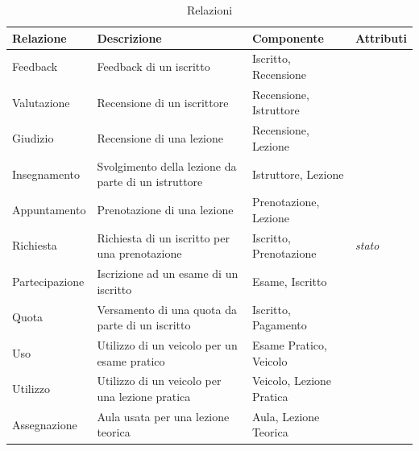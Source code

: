 \documentclass[10pt,twoside]{article}
\begin{document}
{    \begin{table}[H]
        \centering
        \begin{tabularx}{\textwidth}{|>{\centering\arraybackslash}p{2.6cm}|>{\centering\arraybackslash}X|>{\centering\arraybackslash}p{4.85cm}|>{\centering\arraybackslash}X|}
            \hline
            \rowcolor{lightgray!40}
            \textbf{Relazione} & \textbf{Descrizione} & \textbf{Componente} & \textbf{Attributi} \\
            \hline
            \rowcolor{white!40}
            Feedback & Feedback di un iscritto & Iscritto, Recensione & \\
            \hline
            \rowcolor{white!40}
            Valutazione & Recensione di un iscrittore & Recensione, Istruttore & \\
            \hline
            \rowcolor{white!40}
            Giudizio & Recensione di una lezione & Recensione, Lezione & \\
            \hline
            \rowcolor{white!40}
            Insegnamento & Svolgimento della lezione da parte di un istruttore & Istruttore, Lezione & \\
            \hline
            \rowcolor{white!40}
            Appuntamento & Prenotazione di una lezione & Prenotazione, Lezione & \\
            \hline
            \rowcolor{white!40}
            Richiesta & Richiesta di un iscritto per una prenotazione & Iscritto, Prenotazione & \textit{stato}\\
            \hline
            \rowcolor{white!40}
            Partecipazione & Iscrizione ad un esame di un iscritto & Esame, Iscritto & \\
            \hline
            \rowcolor{white!40}
            Quota & Versamento di una quota da parte di un iscritto & Iscritto, Pagamento & \\
            \hline
            \rowcolor{white!40}
            Uso & Utilizzo di un veicolo per un esame pratico & Esame Pratico, Veicolo& \\
            \hline
            \rowcolor{white!40}
            Utilizzo & Utilizzo di un veicolo per una lezione pratica & Veicolo, Lezione Pratica & \\
            \hline
            \rowcolor{white!40}
            Assegnazione & Aula usata per una lezione teorica & Aula, Lezione Teorica & \\
            \hline
        \end{tabularx}
        \caption{Relazioni}
        \label{fig:tabellaRelazioni}
    \end{table}

}
\end{document}
